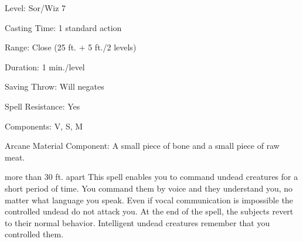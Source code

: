 
\begin{description*}
\item[Level:] Sor/Wiz 7
\item[Casting Time:] 1 standard action
\item[Range:] Close (25 ft. + 5 ft./2 levels)
\item[Duration:] 1 min./level
\item[Saving Throw:] Will negates
\item[Spell Resistance:] Yes
\item[Components:] V, S, M
\item[Arcane Material Component:] A small piece of bone and a small piece of raw meat.
\end{description*}

more than 30 ft. apart
This spell enables you to command undead creatures for a short period of time.
You command them by voice and they understand you, no matter what language you
speak. Even if vocal communication is impossible the controlled undead do not attack
you. At the end of the spell, the subjects revert to their normal behavior.
Intelligent undead creatures remember that you controlled them.
